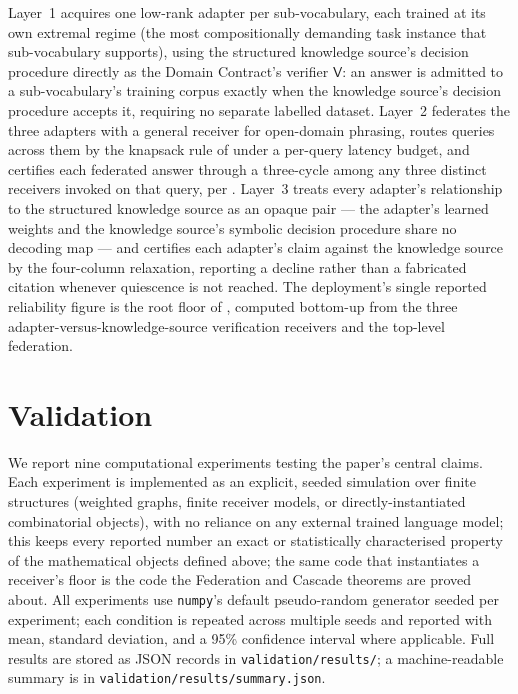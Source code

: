\documentclass[11pt,twocolumn,a4paper]{article}
\theoremstyle{rdm}
\theoremstyle{definition}
\theoremstyle{remark}
\newcommand{\Verd}{\mathsf{V}}
\begin{document}
Layer~1 acquires one low-rank adapter per sub-vocabulary, each trained at
its own extremal regime (the most compositionally demanding task instance
that sub-vocabulary supports), using the structured knowledge source's
decision procedure directly as the Domain Contract's verifier $\Verd$: an
answer is admitted to a sub-vocabulary's training corpus exactly when the
knowledge source's decision procedure accepts it, requiring no separate
labelled dataset. Layer~2 federates the three adapters with a general
receiver for open-domain phrasing, routes queries across them by the
knapsack rule of  under a per-query latency budget, and
certifies each federated answer through a three-cycle among any three
distinct receivers invoked on that query, per . Layer~3
treats every adapter's relationship to the structured knowledge source as
an opaque pair --- the adapter's learned weights and the knowledge source's
symbolic decision procedure share no decoding map --- and certifies each
adapter's claim against the knowledge source by the four-column relaxation,
reporting a decline rather than a fabricated citation whenever quiescence is
not reached. The deployment's single reported reliability figure is the
root floor of , computed bottom-up from the three
adapter-versus-knowledge-source verification receivers and the top-level
federation.


\section{Validation}
\label{sec:validation}

We report nine computational experiments testing the paper's central
claims. Each experiment is implemented as an explicit, seeded simulation
over finite structures (weighted graphs, finite receiver models, or
directly-instantiated combinatorial objects), with no reliance on any
external trained language model; this keeps every reported number an exact
or statistically characterised property of the mathematical objects defined
above; the same code that instantiates a receiver's floor is the code the
Federation and Cascade theorems are proved about. All experiments use
\texttt{numpy}'s default pseudo-random generator seeded per experiment; each
condition is repeated across multiple seeds and reported with mean, standard
deviation, and a 95\% confidence interval where applicable. Full results are
stored as JSON records in \texttt{validation/results/}; a machine-readable
summary is in \texttt{validation/results/summary.json}.
\end{document}
